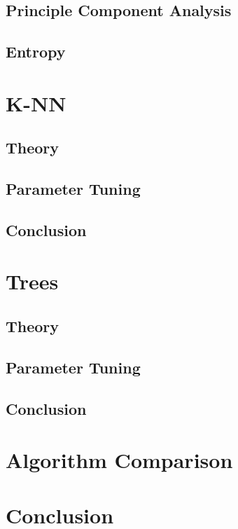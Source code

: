 \documentclass[12pt,a4paper]{article}
\begin{document}
\subsection{Principle Component Analysis}

\subsection{Entropy}


\section{K-NN}

\subsection{Theory}

\subsection{Parameter Tuning}

\subsection{Conclusion}


\section{Trees}

\subsection{Theory}

\subsection{Parameter Tuning}

\subsection{Conclusion}


\section{Algorithm Comparison}


\section{Conclusion}
\end{document}
